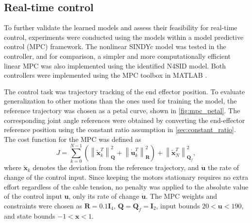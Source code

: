 \documentclass[../main.tex]{subfiles}
\begin{document}
\subsection{Real-time control}
\label{sec:mpc}
To further validate the learned models and assess their feasibility for real-time control, experiments were conducted using the models within a model predictive control (MPC) framework. The nonlinear SINDYc model was tested in the controller, and for comparison, a simpler and more computationally efficient linear MPC was also implemented using the identified N4SID model. Both controllers were implemented using the MPC toolbox in MATLAB \cite{MPCtoolbox}.

The control task was trajectory tracking of the end effector position. To evaluate generalization to other motions than the ones used for training the model, the reference trajectory was chosen as a petal curve, shown in \cref{fig:mpc_petal}. The corresponding joint angle references were obtained by converting the end-effector reference position using the constant ratio assumption in \cref{sec:constant_ratio}. The cost function for the MPC was defined as
\begin{equation}
    J = \sum_{k=0}^{N-1} \left( \left\|\tilde{\bm{x}}_k^T\right\|_{\bm{Q}}^2 + \left\|\dot{\bm{u}}_k^T\right\|_{\bm{R}}^2  \right) + \left\|\tilde{\bm{x}}_N^T\right\|_{\bm{Q}_f}^2,
\end{equation}
where $\bm{\tilde{x}}_k$ denotes the deviation from the reference trajectory, and $\dot{\bm{u}}$ the rate of change of the control input. Since keeping the motors stationary requires no extra effort regardless of the cable tension, no penalty was applied to the absolute value of the control input $\bm{u}$, only its rate of change $\dot{\bm{u}}$. The MPC weights and constraints were chosen as $\bm{R} = 0.1 \bm{I}_{4}$, $\bm{Q} = \bm{Q}_f = \bm{I}_2$, input bounds $20 < \bm{u}< 190$, and state bounds $-1 < \bm{x} < 1$. 



\end{document}
